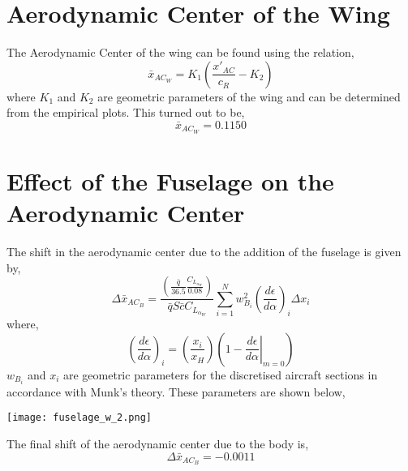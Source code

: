 \documentclass[letterpaper,12pt]{article}
\begin{document}
\section{Aerodynamic Center of the Wing}
The Aerodynamic Center of the wing can be found using the relation,
\begin{equation*}
{\bar{x}}_{AC_W} = K_1\left(\frac{x'_{AC}}{c_R} - K_2\right)
\end{equation*}
where $K_1$ and $K_2$ are geometric parameters of the wing and can be determined from the empirical plots. This turned out to be,
\begin{equation*}
{\bar{x}}_{AC_W} = 0.1150
\end{equation*}
\section{Effect of the Fuselage on the Aerodynamic Center}
The shift in the aerodynamic center due to the addition of the fuselage is given by,
\begin{equation*}
\Delta\bar{x}_{{AC}_B} = \frac{\left(\frac{\bar{q}}{36.5}\frac{C_{L_{\alpha_W}}}{0.08}\right)}{\bar{q}S\bar{c}C_{L_{\alpha_W}}}\sum_{i = 1}^N w_{B_i}^2 \left(\frac{d\epsilon}{d\alpha}\right)_i \Delta x_i
\end{equation*}
where,
\begin{equation*}
\left(\frac{d\epsilon}{d\alpha}\right)_i = \left(\frac{x_i}{x_H}\right)\left(1 - \left.\frac{d\epsilon}{d\alpha}\right\vert_{m = 0}\right)
\end{equation*}
$w_{B_i}$ and $x_i$ are geometric parameters for the discretised aircraft sections in accordance with Munk's theory. These parameters are shown below,
\begin{center}
\texttt{[image: fuselage\_w\_2.png]}
\end{center}
\vspace{0.3cm}
The final shift of the aerodynamic center due to the body is,
\begin{equation*}
\Delta\bar{x}_{{AC}_B} = -0.0011
\end{equation*}
\end{document}
